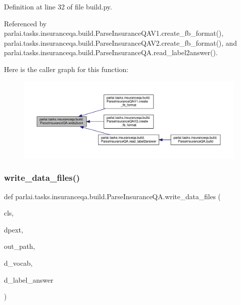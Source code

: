 Definition at line 32 of file build.\+py.



Referenced by parlai.\+tasks.\+insuranceqa.\+build.\+Parse\+Insurance\+Q\+A\+V1.\+create\+\_\+fb\+\_\+format(), parlai.\+tasks.\+insuranceqa.\+build.\+Parse\+Insurance\+Q\+A\+V2.\+create\+\_\+fb\+\_\+format(), and parlai.\+tasks.\+insuranceqa.\+build.\+Parse\+Insurance\+Q\+A.\+read\+\_\+label2answer().

Here is the caller graph for this function\+:
\nopagebreak
\begin{figure}[H]
\begin{center}
\leavevmode
\includegraphics[width=350pt]{classparlai_1_1tasks_1_1insuranceqa_1_1build_1_1ParseInsuranceQA_afb5e7fdf077dea815bdd256c5a750069_icgraph}
\end{center}
\end{figure}
\mbox{\label{classparlai_1_1tasks_1_1insuranceqa_1_1build_1_1ParseInsuranceQA_abd3ae5efba9775554d68e911fd36c840}} 
\subsubsection{\texorpdfstring{write\+\_\+data\+\_\+files()}{write\_data\_files()}}
{\footnotesize\ttfamily def parlai.\+tasks.\+insuranceqa.\+build.\+Parse\+Insurance\+Q\+A.\+write\+\_\+data\+\_\+files (\begin{DoxyParamCaption}\item[{}]{cls,  }\item[{}]{dpext,  }\item[{}]{out\+\_\+path,  }\item[{}]{d\+\_\+vocab,  }\item[{}]{d\+\_\+label\+\_\+answer }\end{DoxyParamCaption})}




